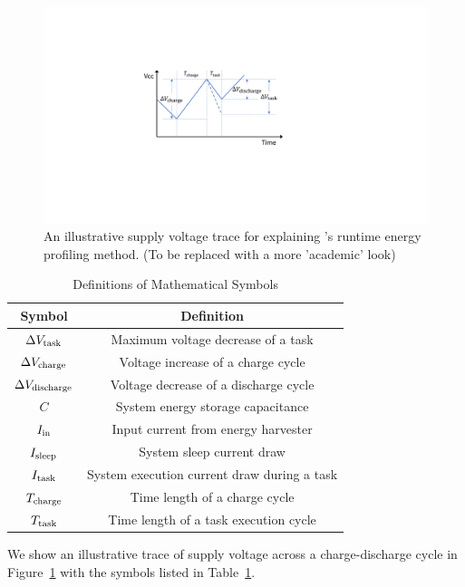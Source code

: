 \begin{figure}[!t]
    \centering
    \includegraphics[width=0.8\columnwidth]{ch5_optic/figures/temp.pdf}
    \caption{An illustrative supply voltage trace for explaining \nn{}'s runtime energy profiling method. (To be replaced with a more 'academic' look) }
    \label{fig:math}
\end{figure}

\begin{table}[!t]
    \renewcommand{\arraystretch}{1.2}
    \centering
    \caption{Definitions of Mathematical Symbols}
    \label{tab:symbols}
    \begin{tabular}{|c|c|}
    \hline
    \textbf{Symbol} & \textbf{Definition} \\
    \hline
    $\Delta V_{\text{task}}$ & Maximum voltage decrease of a task \\
    $\Delta V_{\text{charge}}$ & Voltage increase of a charge cycle \\
    $\Delta V_{\text{discharge}}$ & Voltage decrease of a discharge cycle \\
    $C$ & System energy storage capacitance \\
    $I_{\text{in}}$ & Input current from energy harvester \\
    $I_{\text{sleep}}$ & System sleep current draw \\
    $I_{\text{task}}$ & System execution current draw during a task \\
    $T_{\text{charge}}$ & Time length of a charge cycle  \\
    $T_{\text{task}}$ & Time length of a task execution cycle  \\
    \hline
    \end{tabular}
\end{table}

We show an illustrative trace of supply voltage across a charge-discharge cycle in Figure~\ref{fig:math} with the symbols listed in Table~\ref{tab:symbols}. 

